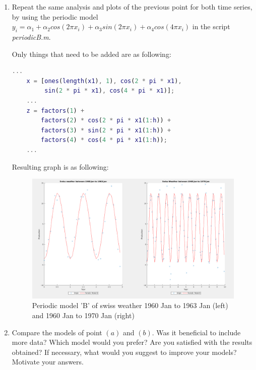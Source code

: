 \documentclass[unicode,11pt,a4paper,oneside,numbers=endperiod,openany]{scrartcl}
\begin{document}
\begin{enumerate}[label=(\alph*)]
\newpage

\item Repeat the same analysis and plots of the previous point for both time series, by using the periodic model
${y_i = \alpha_1 + \alpha_2 cos(2\pi x_i ) + \alpha_3 sin(2\pi x_i ) + \alpha_4 cos(4\pi x_i)}$ in the script \textit{periodicB.m}.

Only things that need to be added are as following:

\begin{lstlisting}[language=Matlab]
    ...
    x = [ones(length(x1), 1), cos(2 * pi * x1), 
         sin(2 * pi * x1), cos(4 * pi * x1)];
    ...
    z = factors(1) + 
        factors(2) * cos(2 * pi * x1(1:h)) + 
        factors(3) * sin(2 * pi * x1(1:h)) +
        factors(4) * cos(4 * pi * x1(1:h));
    ...
\end{lstlisting}

Resulting graph is as following: \\

 \begin{figure}[h!]
    \begin{minipage}[c]{1\linewidth}
        \centering
        \includegraphics[width=0.9\linewidth]{./figures/ex3b.png}
    \end{minipage}
  \caption{Periodic model 'B' of swiss weather 1960 Jan to 1963 Jan (left) and 1960 Jan to 1970 Jan (right)}
\end{figure}

\vspace{10px}

\item Compare the models of point ${(a)}$ and ${(b)}$. Was it beneficial to include more data? Which model would you
prefer? Are you satisfied with the results obtained? If necessary, what would you suggest to improve your
models? Motivate your answers. \\


\end{enumerate}
\end{document}
